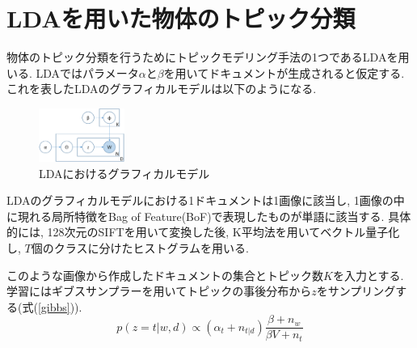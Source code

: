 \section{LDAを用いた物体のトピック分類}
物体のトピック分類を行うためにトピックモデリング手法の1つであるLDA\cite{lda}を用いる.
LDAではパラメータ$\alpha$と$\beta$を用いてドキュメントが生成されると仮定する.
これを表したLDAのグラフィカルモデルは以下のようになる.
\begin{figure}[h!]
	\begin{center}
		\includegraphics[width=0.25\textwidth,clip]{img/graphicalmodel.eps}
	\end{center}
	\caption{LDAにおけるグラフィカルモデル}
	\label{fig:graphical_model}
\end{figure} 
\par
LDAのグラフィカルモデルにおける1ドキュメントは1画像に該当し, 
1画像の中に現れる局所特徴をBag of Feature(BoF)で表現したものが単語に該当する.
具体的には, 128次元のSIFT\cite{sift}を用いて変換した後, 
K平均法\cite{kmeans}を用いてベクトル量子化し, $T$個のクラスに分けたヒストグラムを用いる.
\par
このような画像から作成したドキュメントの集合とトピック数$K$を入力とする.
学習にはギブスサンプラーを用いてトピックの事後分布から$z$をサンプリングする(式(\ref{gibbs})).
\begin{equation}
p(z = t|w, d) \propto ( \alpha_{t} + n_{t|d} ) \frac{\beta + n_w}{\beta V + n_t}
\label{gibbs}
\end{equation}
\par


